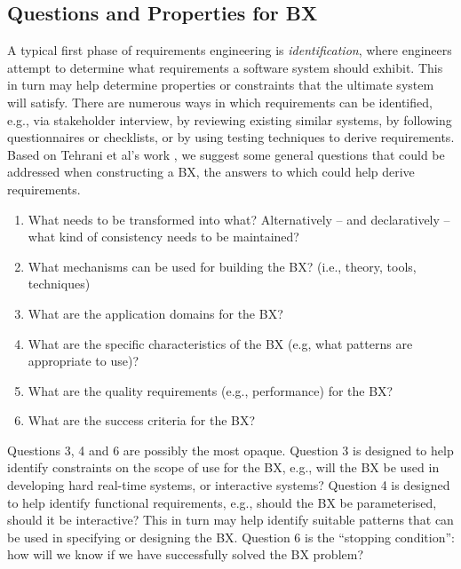 \subsection{Questions and Properties for BX}
A typical first phase of requirements engineering is \textit{identification}, where engineers attempt to determine what requirements a software system should exhibit. This in turn may help determine properties or constraints that the ultimate system will satisfy. There are numerous ways in which requirements can be identified, e.g., via stakeholder interview, by reviewing existing similar systems, by following questionnaires or checklists, or by using testing techniques to derive requirements. Based on Tehrani et al's work \cite{TehraniZL16}, we suggest some general questions that could be addressed when constructing a BX, the answers to which could help derive requirements.

\begin{enumerate}
\item What needs to be transformed into what? Alternatively -- and declaratively -- what kind of consistency needs to be maintained?
\item What mechanisms can be used for building the BX? (i.e., theory, tools, techniques)
\item What are the application domains for the BX?
\item What are the specific characteristics of the BX (e.g, what patterns are appropriate to use)?
\item What are the quality requirements (e.g., performance) for the BX?
\item What are the success criteria for the BX?
\end{enumerate}
Questions 3, 4 and 6 are possibly the most opaque. Question 3 is designed to help identify constraints on the scope of use for the BX, e.g., will the BX be used in developing hard real-time systems, or interactive systems? Question 4 is designed to help identify functional requirements, e.g., should the BX be parameterised, should it be interactive? This in turn may help identify suitable patterns that can be used in specifying or designing the BX. Question 6 is the ``stopping condition'': how will we know if we have successfully solved the BX problem?

